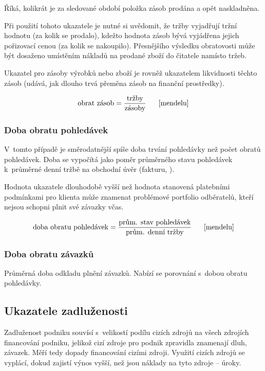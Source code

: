 Říká, kolikrát je za sledované období položka zásob prodána a opět naskladněna.

Při použití tohoto ukazatele je nutné si uvědomit, že tržby vyjadřují tržní hodnotu (za kolik se prodalo), kdežto hodnota zásob bývá vyjádřena jejich pořizovací cenou (za kolik se nakoupilo). Přesnějšího výsledku obratovosti může být dosaženo umístěním nákladů na prodané zboží do čitatele namísto tržeb.

Ukazatel pro zásoby výrobků nebo zboží je rovněž ukazatelem likvidnosti těchto zásob (udává, jak dlouho trvá přeměna zásob na finanční prostředky).

$$\vz{obrat zásob}{tržby}{zásoby} \scite{mendelu}$$


\subsubsection{Doba obratu pohledávek}
V~tomto případě je směrodatnější spíše doba trvání pohledávky než počet obratů pohledávek. Doba se vypočítá jako poměr průměrného stavu pohledávek k~průměrné denní tržbě na obchodní úvěr (fakturu, ).

Hodnota ukazatele dlouhodobě vyšší než hodnota stanovená platebními podmínkami pro klienta může znamenat problémové portfolio odběratelů, kteří nejsou schopni plnit své závazky včas.

$$\vz{doba obratu pohledávek}{prům. stav pohledávek}{prům. denní tržby} \scite{mendelu}$$

\subsubsection{Doba obratu závazků}
Průměrná doba odkladu plnění závazků. Nabízí se porovnání s~dobou obratu pohledávky. 





\subsection{Ukazatele zadluženosti}

Zadluženost podniku souvísí s~velikostí podílu cizích zdrojů na všech zdrojích financování podniku, jelikož cizí zdroje pro podnik zpravidla znamenají dluh, závazek. Měří tedy dopady financování cizími zdroji. Využití cizích zdrojů se vyplácí, dokud zajistí výnos vyšší, než jsou náklady na tyto zdroje -- úroky.

